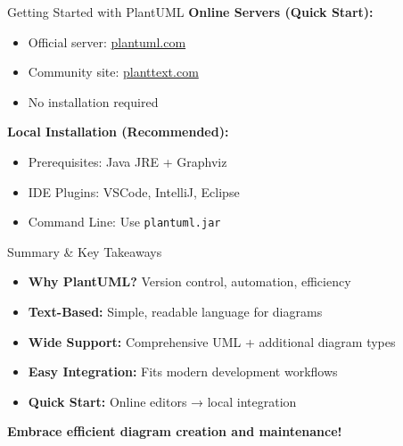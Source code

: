 \documentclass{beamer}
\begin{document}
\begin{frame}[t]{Getting Started with PlantUML}
    \textbf{Online Servers (Quick Start):}
    \begin{itemize}
        \item Official server: \href{http://plantuml.com}{plantuml.com}
        \item Community site: \href{http://planttext.com}{planttext.com}
        \item No installation required
    \end{itemize}
    
    \vspace{0.5cm}
    \textbf{Local Installation (Recommended):}
    \begin{itemize}
        \item Prerequisites: Java JRE + Graphviz
        \item IDE Plugins: VSCode, IntelliJ, Eclipse
        \item Command Line: Use \texttt{plantuml.jar}
    \end{itemize}
\end{frame}

\begin{frame}[t]{Summary \& Key Takeaways}
    \begin{itemize}
        \item \textbf{Why PlantUML?} Version control, automation, efficiency
        \item \textbf{Text-Based:} Simple, readable language for diagrams
        \item \textbf{Wide Support:} Comprehensive UML + additional diagram types
        \item \textbf{Easy Integration:} Fits modern development workflows
        \item \textbf{Quick Start:} Online editors → local integration
    \end{itemize}
    
    \vspace{0.5cm}
    \textbf{Embrace efficient diagram creation and maintenance!}
\end{frame}
\end{document}
